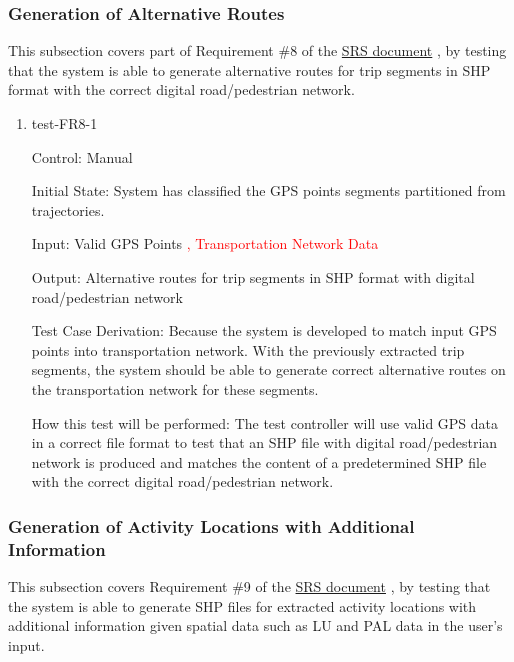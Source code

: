 \documentclass[12pt, titlepage]{article}
\begin{document}
\subsubsection{Generation of Alternative Routes}

This subsection covers part of Requirement \#8 of the \href{https://github.com/paezha/PyERT-BLACK/blob/main/docs/SRS/SRS.pdf}{SRS document} \citep{SRS}, by testing that the system is able to generate alternative routes for trip segments in SHP format with the correct digital road/pedestrian network.

\begin{enumerate}

\item{test-FR8-1\\} \label{test-FR8-1}

Control: Manual 
					
Initial State: System has classified the GPS points segments partitioned from trajectories.
					
Input: Valid GPS Points \textcolor{red}{, Transportation Network Data} 
					
Output: Alternative routes for trip segments in SHP format with digital road/pedestrian network

Test Case Derivation: Because the system is developed to match input GPS points into transportation network. With the previously extracted trip segments, the system should be able to generate correct alternative routes on the transportation network for these segments.
					
How this test will be performed: The test controller will use valid GPS data in a correct file format to test that an SHP file with digital road/pedestrian network is produced and matches the content of a predetermined SHP file with the correct digital road/pedestrian network.

\end{enumerate}

\subsubsection{Generation of Activity Locations with Additional Information}

This subsection covers Requirement \#9 of the \href{https://github.com/paezha/PyERT-BLACK/blob/main/docs/SRS/SRS.pdf}{SRS document} \citep{SRS}, by testing that the system is able to generate SHP files for extracted activity locations with additional information given spatial data such as LU and PAL data in the user's input.
\end{document}
